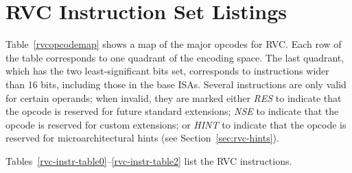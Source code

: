 \clearpage

\section{RVC Instruction Set Listings}

Table~\ref{rvcopcodemap} shows a map of the major opcodes for RVC.
Each row of the table corresponds to one quadrant of the encoding
space.  The last quadrant, which has the two
least-significant bits set, corresponds to instructions wider
than 16 bits, including those in the base ISAs.  Several instructions
are only valid for certain operands; when invalid, they are marked
either {\em RES} to indicate that the opcode is reserved for future
standard extensions; {\em NSE} to indicate that the opcode is reserved
for custom extensions; or {\em HINT} to indicate that the opcode
is reserved for microarchitectural hints (see Section~\ref{sec:rvc-hints}).



Tables~\ref{rvc-instr-table0}--\ref{rvc-instr-table2} list the RVC instructions.

